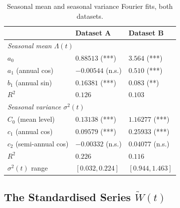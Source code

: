 \begin{table}[htbp]
\centering
\small
\caption{Seasonal mean and seasonal variance Fourier fits, both datasets.}
\label{tab:seasonal}
\begin{tabular}{l l l}
\toprule
& \textbf{Dataset A} & \textbf{Dataset B} \\
\midrule
\multicolumn{3}{l}{\textit{Seasonal mean $\Lambda(t)$}} \\
$a_0$ & $0.88513$ (***) & $3.564$ (***) \\
$a_1$ (annual cos) & $-0.00544$ (n.s.) & $0.510$ (***) \\
$b_1$ (annual sin) & $0.16381$ (***) & $0.083$ (**) \\
$R^2$ & $0.126$ & $0.103$ \\
\midrule
\multicolumn{3}{l}{\textit{Seasonal variance $\sigma^2(t)$}} \\
$C_0$ (mean level) & $0.13138$ (***) & $1.16277$ (***) \\
$c_1$ (annual cos) & $0.09579$ (***) & $0.25933$ (***) \\
$c_2$ (semi-annual cos) & $-0.00332$ (n.s.) & $0.04077$ (n.s.) \\
$R^2$ & $0.226$ & $0.116$ \\
$\sigma^2(t)$ range & $[0.032, 0.224]$ & $[0.944, 1.463]$ \\
\bottomrule
\end{tabular}
\end{table}

\subsection{The Standardised Series $\widetilde W(t)$}
\label{sec:phase1-wtilde}

